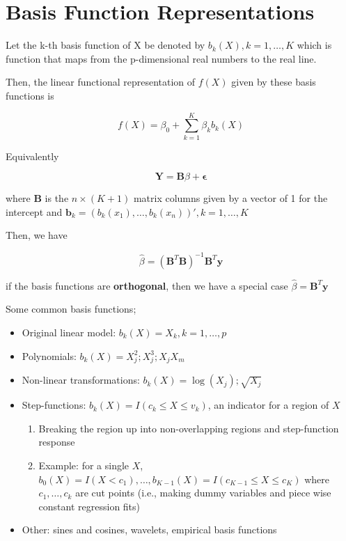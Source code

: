 \documentclass[
]{book}
\begin{document}
\hypertarget{basis-function-representations}{%
\section{Basis Function Representations}\label{basis-function-representations}}

Let the k-th basis function of X be denoted by \(b_k(X), k = 1,\dots, K\) which is function that maps from the p-dimensional real numbers to the real line.

Then, the linear functional representation of \(f(X)\) given by these basis functions is

\[
f(X) = \beta_0 + \sum_{k=1}^K \beta_k b_k(X)
\]

Equivalently

\[
\mathbf{Y} = \mathbf{B} \beta + \mathbf{\epsilon}
\]

where \(\mathbf{B}\) is the \(n \times (K+1)\) matrix columns given by a vector of 1 for the intercept and \(\mathbf{b}_k =(b_k(x_1), \dots, b_k (x_n))', k = 1, \dots, K\)

Then, we have

\[
\hat{\beta} = (\mathbf{B}^T \mathbf{B})^{-1} \mathbf{B}^T\mathbf{y}
\]

if the basis functions are \textbf{orthogonal}, then we have a special case \(\hat{\beta} = \mathbf{B}^T \mathbf{y}\)

Some common basis functions;

\begin{itemize}
\item
  Original linear model: \(b_k(X) = X_k, k = 1, \dots, p\)
\item
  Polynomials: \(b_k(X) = X^2_j; X^3_j; X_jX_m\)
\item
  Non-linear transformations: \(b_k(X)= \log(X_j); \sqrt{X_j}\)
\item
  Step-functions: \(b_k(X) = I(c_k \le X \le v_k)\), an indicator for a region of \(X\)

  \begin{enumerate}
  \def\labelenumi{\arabic{enumi}.}
  \item
    Breaking the region up into non-overlapping regions and step-function response
  \item
    Example: for a single \(X\), \(b_0 (X) = I(X < c_1), \dots, b_{K-1}(X) = I(c_{K-1} \le X \le c_K)\) where \(c_1, \dots, c_k\) are cut points (i.e., making dummy variables and piece wise constant regression fits)
  \end{enumerate}
\item
  Other: sines and cosines, wavelets, empirical basis functions
\end{itemize}
\end{document}
